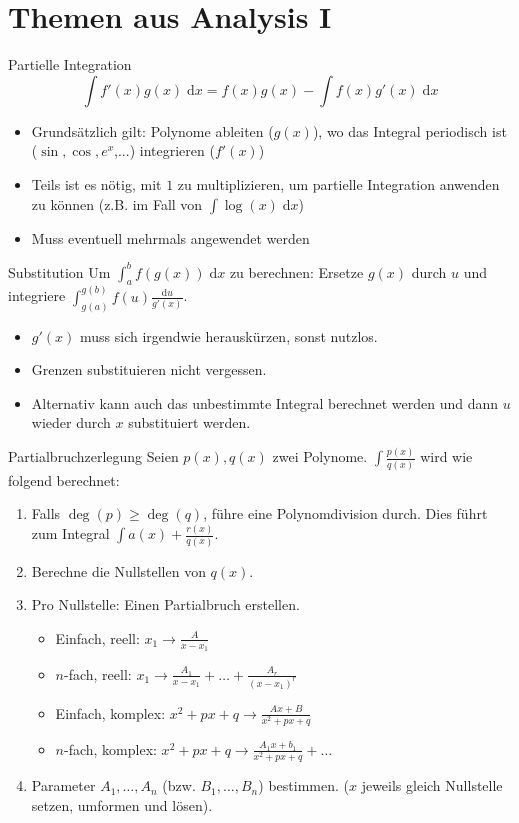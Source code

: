 \documentclass[a4paper,10pt]{article}
\def\dx{\; \mathrm{d}x}
\begin{document}
\section{Themen aus Analysis I}
\begin{mainbox}{Partielle Integration}
 \vspace{-12pt}
 $$\int f'(x) g(x) \dx = f(x)g(x) - \int f(x) g'(x) \dx$$
\end{mainbox}
\begin{itemize}
 \item Grundsätzlich gilt: Polynome ableiten ($g(x)$), wo das Integral periodisch ist ($\sin, \cos, e^x$,...) integrieren ($f'(x)$)
 \item Teils ist es nötig, mit $1$ zu multiplizieren, um partielle Integration anwenden zu können (z.B. im Fall von $\int \log(x) \dx$)
 \item Muss eventuell mehrmals angewendet werden
\end{itemize}
\begin{mainbox}{Substitution}
 Um $\int_a^b f(g(x)) \dx$ zu berechnen: Ersetze $g(x)$ durch $u$ und integriere $\int_{g(a)}^{g(b)} f(u) \frac{\text{d}u}{g'(x)}$.
\end{mainbox}
\begin{itemize}
 \item $g'(x)$ muss sich irgendwie herauskürzen, sonst nutzlos.
 \item Grenzen substituieren nicht vergessen.
 \item Alternativ kann auch das unbestimmte Integral berechnet werden und dann $u$ wieder durch $x$ substituiert werden.
\end{itemize}

\begin{mainbox}{Partialbruchzerlegung}
 Seien $p(x), q(x)$ zwei Polynome. $\int \frac{p(x)}{q(x)}$ wird wie folgend berechnet:
 \begin{enumerate}
  \item Falls $\deg(p) \ge \deg(q)$, führe eine Polynomdivision durch. Dies führt zum Integral $\int a(x) + \frac{r(x)}{q(x)}$.
  \item Berechne die Nullstellen von $q(x)$.
  \item Pro Nullstelle: Einen Partialbruch erstellen.
  \begin{itemize}[left=0pt]
   \item Einfach, reell: $x_1 \to \frac{A}{x - x_1}$
   \item $n$-fach, reell: $x_1 \to \frac{A_1}{x - x_1} + \ldots + \frac{A_r}{(x-x_1)^r}$ 
   \item Einfach, komplex: $x^2 + px + q \to \frac{Ax + B} {x^2 + px + q}$
   \item $n$-fach, komplex: $x^2 + px + q \to \frac{A_1x+b_1}{x^2+px+q} + \ldots$
  \end{itemize}
  \item Parameter $A_1, \ldots, A_n$ (bzw. $B_1, \ldots, B_n$) bestimmen. ($x$ jeweils gleich Nullstelle setzen, umformen und lösen).

 \end{enumerate}
\end{mainbox}
\end{document}
